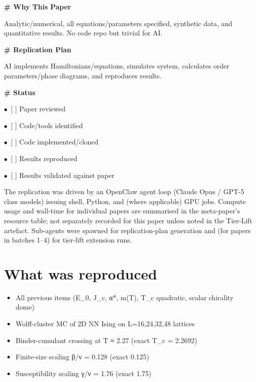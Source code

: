 \documentclass[11pt]{article}
\begin{document}
\par\medskip\textbf{\# Why This Paper}\par
Analytic/numerical, all equations/parameters specified, synthetic data, and quantitative results. No code repo but trivial for AI.

\par\medskip\textbf{\# Replication Plan}\par
AI implements Hamiltonians/equations, simulates system, calculates order parameters/phase diagrams, and reproduces results.

\par\medskip\textbf{\# Status}\par
\par$\bullet$\ [ ] Paper reviewed
\par$\bullet$\ [ ] Code/tools identified
\par$\bullet$\ [ ] Code implemented/cloned
\par$\bullet$\ [ ] Results reproduced
\par$\bullet$\ [ ] Results validated against paper
\normalsize

The replication was driven by an OpenClaw agent loop (Claude Opus / GPT-5 class models) issuing shell, Python, and (where applicable) GPU jobs. Compute usage and wall-time for individual papers are summarised in the meta-paper's resource table; not separately recorded for this paper unless noted in the Tier-Lift artefact. Sub-agents were spawned for replication-plan generation and (for papers in batches 1--4) for tier-lift extension runs.

\section{What was reproduced}
\begin{itemize}
\item All previous items (E\_0, J\_c, α*, m(T), T\_c quadratic, scalar chirality dome)
\item Wolff-cluster MC of 2D NN Ising on L=16,24,32,48 lattices
\item Binder-cumulant crossing at T ≈ 2.27 (exact T\_c = 2.2692)
\item Finite-size scaling β/ν = 0.128 (exact 0.125)
\item Susceptibility scaling γ/ν = 1.76 (exact 1.75)
\end{itemize}
\end{document}
